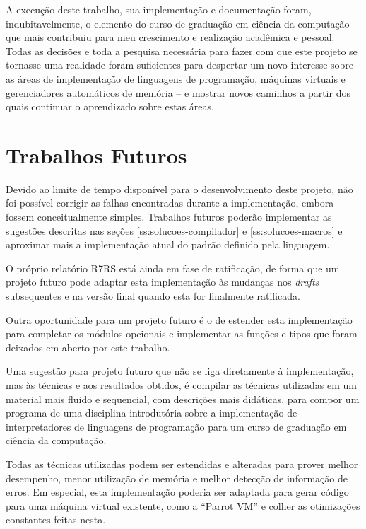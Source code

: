 A execução deste trabalho, sua implementação e documentação foram,
indubitavelmente, o elemento do curso de graduação em ciência da computação que
mais contribuiu para meu crescimento e realização acadêmica e pessoal. Todas as decisões e
toda a pesquisa necessária para fazer com que este projeto se tornasse uma
realidade foram suficientes para despertar um novo interesse sobre as áreas de
implementação de linguagens de programação, máquinas virtuais e gerenciadores
automáticos de memória -- e mostrar novos caminhos a partir dos quais continuar
o aprendizado sobre estas áreas.

\section{Trabalhos Futuros}
\label{sec:trabalhos-futuros}

Devido ao limite de tempo disponível para o desenvolvimento deste projeto, não foi
possível corrigir as falhas encontradas durante a implementação, embora fossem
conceitualmente simples. Trabalhos futuros poderão implementar as sugestões
descritas nas seções \ref{ss:solucoes-compilador} e \ref{ss:solucoes-macros} e
aproximar mais a implementação atual do padrão definido pela linguagem.

O próprio relatório \acs{R7RS} está ainda em fase de ratificação, de forma que
um projeto futuro pode adaptar esta implementação às mudanças nos \textit{drafts}
subsequentes e na versão final quando esta for finalmente ratificada.

Outra oportunidade para um projeto futuro é o de estender esta implementação
para completar os módulos opcionais e implementar as funções e tipos que foram
deixados em aberto por este trabalho.

Uma sugestão para projeto futuro que não se liga diretamente à implementação,
mas às técnicas e aos resultados obtidos, é compilar as técnicas utilizadas em
um material mais fluido e sequencial, com descrições mais didáticas, para
compor um programa de uma disciplina introdutória sobre a implementação de
interpretadores de linguagens de programação para um curso de graduação em
ciência da computação.

Todas as técnicas utilizadas podem ser estendidas e alteradas para prover
melhor desempenho, menor utilização de memória e melhor detecção de informação
de erros.  Em especial, esta implementação poderia ser adaptada para gerar
código para uma máquina virtual existente, como a ``Parrot VM'' e colher as
otimizações constantes feitas nesta.

